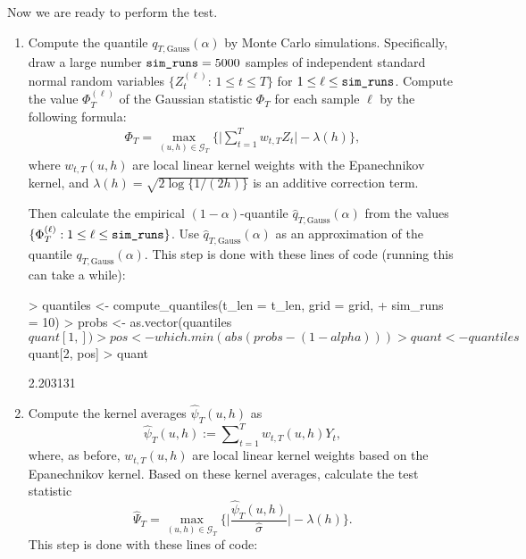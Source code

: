 \documentclass[a4paper]{scrartcl}
\begin{document}
Now we are ready to perform the test.
\begin{enumerate}[label=\textit{Step \arabic*.}, leftmargin=1.45cm]
  \item Compute the quantile $q_{T,\text{Gauss}}(\alpha)$ by Monte Carlo simulations. Specifically, draw a large number $\verb|sim_runs| = 5000$ samples of independent standard normal random variables $\{Z_{t}^{(\ell)} : \, 1 \le t \le T \}$ for $1 \le \ell \le \verb|sim_runs|$. Compute the value $\Phi_T^{(\ell)}$ of the Gaussian statistic $\Phi_T$ for each sample $\ell$ by the following formula:
\begin{align*}
\Phi_T = \max_{(u, h) \in \mathcal{G}_T}\bigg\{ \Big|\sum\limits_{t=1}^T w_{t, T} Z_{t}\Big| - \lambda(h) \bigg\},
\end{align*}
where $w_{t, T}(u, h)$ are local linear kernel weights with the Epanechnikov kernel, and $\lambda(h) = \sqrt{2 \log \{ 1/(2h) \}}$ is an additive correction term.

Then calculate the empirical $(1-\alpha)$-quantile $\widehat{q}_{T,\text{Gauss}}(\alpha)$ from the values $\{ \Phi_T^{(\ell)}: 1 \le \ell \le \verb|sim_runs| \}$. Use $\widehat{q}_{T,\text{Gauss}}(\alpha)$ as an approximation of the quantile $q_{T,\text{Gauss}}(\alpha)$.
This step is done with these lines of code (running this can take a while):

\begin{Schunk}
\begin{Sinput}
> quantiles <- compute_quantiles(t_len = t_len, grid = grid,
+                                sim_runs = 10)
> probs <- as.vector(quantiles$quant[1, ])
> pos   <- which.min(abs(probs - (1 - alpha)))
> quant <- quantiles$quant[2, pos]
> quant
\end{Sinput}
\begin{Soutput}
[1] 2.203131
\end{Soutput}
\end{Schunk}
  \item Compute the kernel averages $\widehat{\psi}_{T}(u, h)$ as
  \begin{equation*}
 \widehat{\psi}_{T}(u, h) := \sum\nolimits_{t=1}^T w_{t, T}(u, h) Y_{t},
\end{equation*}
where, as before, $w_{t, T}(u, h)$ are local linear kernel weights based on the Epanechnikov kernel. Based on these kernel averages, calculate the test statistic
$$\widehat{\Psi}_{T} = \max_{(u, h)\in \mathcal{G}_T} \bigg\{ \Big| \frac{\widehat{\psi}_{T}(u, h) }{\widehat{\sigma}}\Big| - \lambda(h) \Bigg\}.$$
This step is done with these lines of code:


\end{enumerate}
\end{document}
